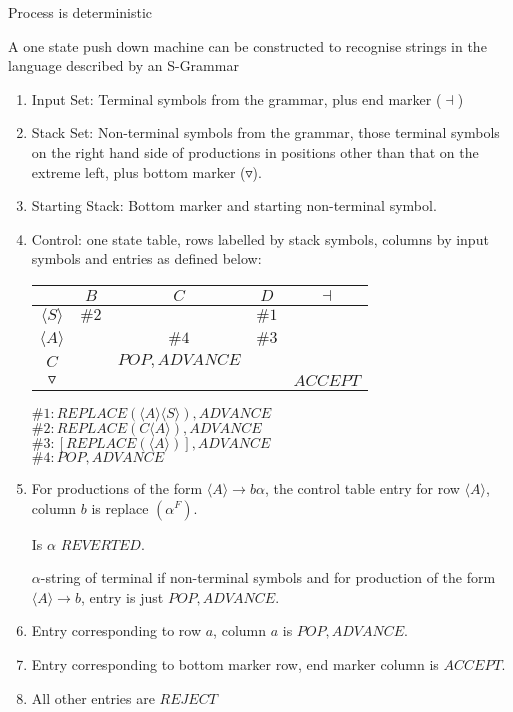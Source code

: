 \documentclass[a4paper,12pt]{article}
\newcommand{\nonterminal}[1]{\langle #1 \rangle}
\begin{document}
Process is deterministic


A one state push down machine can be constructed to recognise strings in
the language described by an S-Grammar

\begin{enumerate}

\item Input Set: Terminal symbols from the grammar, plus end marker
($\dashv$)

\item Stack Set: Non-terminal symbols from the grammar, those terminal
symbols on the right hand side of productions in positions other than
that on the extreme left, plus bottom marker ($\triangledown$). 

\item Starting Stack: Bottom marker and starting non-terminal symbol.

\item Control: one state table, rows labelled by stack symbols, columns
by input symbols and entries as defined below: \\

\begin{tabular}{|c|c|c|c|c|}
\hline
						&	$B$	&	$C$	&	$D$	&	$\dashv$	\\
\hline
$\nonterminal{S}$	&	$\#2$	&			&	$\#1$	&				\\
\hline
$\nonterminal{A}$	&			&	$\#4$	&	$\#3$	&				\\
\hline
$C$					&			&	$POP,ADVANCE$	&		&		\\
\hline
$\triangledown$	&			&			&			&	$ACCEPT$	\\
\hline
\end{tabular}

\vspace{10mm}

$\#1: REPLACE \left( \nonterminal{A}\nonterminal{S}\right),ADVANCE$ \\
$\#2: REPLACE\left ( C \nonterminal{A}\right),ADVANCE$ \\
$\#3: \left[ REPLACE \left( \nonterminal{A}\right) \right],ADVANCE$ \\
$\#4: POP,ADVANCE$ \\

\item For productions of the form $\nonterminal{A} \to b \alpha$, the
control table entry for row $\nonterminal{A}$, column $b$ is replace
$\left( \alpha^{F} \right)$.

Is $\alpha$ $REVERTED$.

$\alpha$-string of terminal if non-terminal symbols and for production
of the form $\nonterminal{A} \to b$, entry is just $POP,ADVANCE$. 

\item Entry corresponding to row $a$, column $a$ is $POP, ADVANCE$.

\item Entry corresponding to bottom marker row, end marker column is
$ACCEPT$.

\item All other entries are $REJECT$

\end{enumerate}
\end{document}
